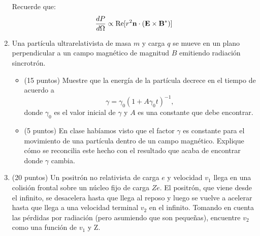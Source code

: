 \documentclass[letterpaper,10pt,onecolumn]{article}
\begin{document}
\begin{enumerate}
Recuerde que:
\begin{displaymath}
\frac{dP}{d\Omega} \propto
\mathrm{Re}[r^2 {\bf n}\cdot ({\bf E}\times {\bf B}^{*})]
\end{displaymath}



\item Una part\'icula ultrarelativista de masa $m$ y carga $q$ se
  mueve en un plano perpendicular a un campo magn\'etico de magnitud
  $B$ emitiendo radiaci\'on sincrotr\'on.   

\begin{itemize}
\item (15 puntos) Muestre que la energ\'ia de la part\'icula decrece
  en el tiempo de acuerdo a  
\begin{displaymath}
\gamma = \gamma_0(1+A\gamma_0 t)^{-1}, 
\end{displaymath}
donde $\gamma_0$ es el valor inicial de $\gamma$ y $A$ es una
constante que  debe encontrar.
\item (5 puntos) En clase hab\'iamos visto que el factor $\gamma$ es
constante para el movimiento de una part\'icula dentro de un campo
magn\'etico. Explique c\'omo se reconcilia este hecho con el resultado
que acaba de encontrar donde $\gamma$ cambia. 
\end{itemize}

\item (20 puntos) Un positr\'on no relativista de carga $e$ y velocidad
  $v_1$ llega en una colisi\'on frontal sobre un n\'ucleo fijo de
  carga $Ze$. El positr\'on, que viene desde el infinito, se
  desacelera hasta que llega al reposo y luego se vuelve a acelerar
  hasta que llega a una velocidad terminal $v_2$ en el
  infinito. Tomando en cuenta las p\'erdidas por radiaci\'on (pero
  asumiendo que son peque\~nas), encuentre $v_2$ como una funci\'on de
  $v_1$ y Z.



\end{enumerate}
\end{document}
